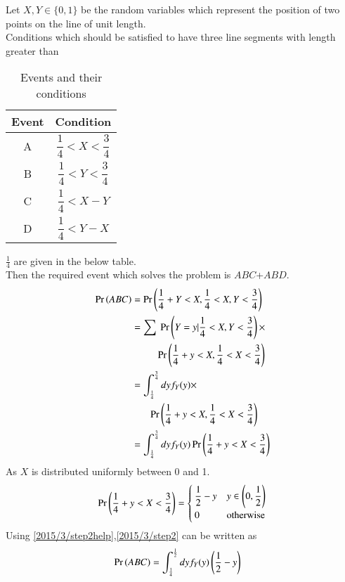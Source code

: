 
  Let $X,Y \in \{0,1\}$ be the random variables which represent the position of two points on the line of unit length.\\
Conditions which should be satisfied to have three line segments with length greater than 
\begin{table}[h]
\centering
\bgroup
\def\arraystretch{2}
\begin{tabular}{|c|c|}
\hline
\textbf{Event} & \textbf{Condition}                     \\\hline
A              & $\dfrac{1}{4}<X<\dfrac{3}{4}$ \\[1ex] \hline
B              & $\dfrac{1}{4}<Y<\dfrac{3}{4}$ \\[1ex] \hline
C              & $\dfrac{1}{4}<X-Y$ \\[1ex] \hline
D           & $\dfrac{1}{4}<Y-X$ \\[1ex] \hline
\end{tabular}
\egroup
\caption{Events and their conditions}
\label{2015/3/tab:Events}
\end{table}
$\frac{1}{4}$ are given in the below table.\\
Then the required event which solves the problem is $ABC$+$ABD$.
\begin{align}
    \Pr\left(ABC\right)&=\Pr\left(\frac{1}{4}+Y<X,\frac{1}{4}<X,Y<\frac{3}{4}\right)\\
    &=\sum~\Pr\left(Y=y|\frac{1}{4}<X,Y<\frac{3}{4}\right)\times\nonumber\\
    &~~~~~~~~~~\Pr\left(\frac{1}{4}+y<X,\frac{1}{4}<X<\frac{3}{4}\right)\\
    &=\int_{\frac{1}{4}}^{\frac{3}{4}}dyf_Y(y)\times\nonumber\\ &~~~~~~~\Pr\left(\frac{1}{4}+y<X,\frac{1}{4}<X<\frac{3}{4}\right)\\
     &=\int_{\frac{1}{4}}^{\frac{3}{4}}dyf_Y(y)\Pr\left(\frac{1}{4}+y<X<\frac{3}{4}\right)\label{2015/3/step2}
     \end{align}
     As $X$ is distributed uniformly between 0 and 1.
     \begin{align}
        \Pr\left(\frac{1}{4}+y<X<\frac{3}{4}\right)=\begin{cases}
        \dfrac{1}{2}-y&y\in \left(0,\dfrac{1}{2}\right)\\
        0&\text{otherwise}
        \end{cases}\label{2015/3/step2help}
     \end{align}
     Using \eqref{2015/3/step2help},\eqref{2015/3/step2} can be written as
     \begin{align}
    \Pr\left(ABC\right)&=\int_{\frac{1}{4}}^{\frac{1}{2}}dyf_Y(y)\left(\frac{1}{2}-y\right)
    \end{align}
